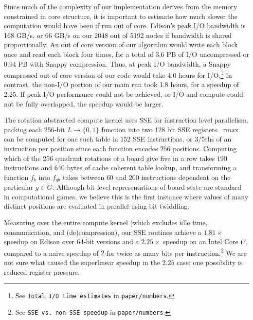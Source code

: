\documentclass[conference]{IEEEtran}
\DeclareMathOperator{\rmax}{rmax}
\begin{document}
Since much of the complexity of our implementation derives from the memory constrained in core
structure, it is important to estimate how much slower the computation would have been if run out of core.
Edison's peak I/O bandwidth is 168 GB/s, or 66 GB/s on our 2048 out of 5192 nodes if bandwidth is shared
proportionally.  An out of core version of our algorithm would write each block once and read each block
four times, for a total of 3.6 PB of I/O uncompressed or 0.94 PB with Snappy compression.  Thus, at peak I/O
bandwidth, a Snappy compressed out of core version of our code would take 4.0 hours for
I/O.\cprotect\footnote{See \verb+Total I/O time estimates+ in \verb+paper/numbers+.}  In contrast,
the non-I/O portion of our main run took 1.8 hours, for a speedup of 2.25.  If peak I/O performance could
not be achieved, or I/O and compute could not be fully overlapped, the speedup would be larger.

The rotation abstracted compute kernel uses SSE for instruction level parallelism, packing
each 256-bit $L \to \{0,1\}$ function into two 128 bit SSE registers.  $\rmax$ can be computed for one such
table in $152$ SSE instructions, or $3/5$ths of an instruction per position since each function
encodes $256$ positions.  Computing which of the 256 quadrant rotations of a board give five in
a row takes $190$ instructions and $640$ bytes of cache coherent table lookup, and transforming a
function $f_b$ into $f_{gb}$ takes between $60$ and $200$ instructions dependent on the particular $g \in G$.
Although bit-level representations of board state are standard in computational games,
we believe this is the first instance where values of many distinct positions are evaluated in parallel
using bit twiddling.

Measuring over the entire compute kernel (which excludes idle time, communication, and (de)compression),
our SSE routines achieve a $1.81\times$ speedup on Edison over 64-bit versions and a $2.25\times$ speedup on
an Intel Core i7, compared to a naive speedup of $2$ for twice as many bits per
instruction.\cprotect\footnote{See \verb+SSE vs. non-SSE speedup+ in \verb+paper/numbers+.}  We are not sure what
caused the superlinear speedup in the $2.25$ case; one possibility is reduced register pressure.
\end{document}
